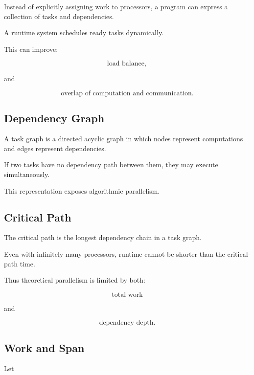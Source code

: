 Instead of explicitly assigning work to processors, a program can express a
collection of tasks and dependencies.

A runtime system schedules ready tasks dynamically.

This can improve:

\[
\boxed{
\text{load balance},
}
\]

and

\[
\boxed{
\text{overlap of computation and communication}.
}
\]

\subsection{Dependency Graph}
\label{subsec:hpmc-dependency-graph}

A task graph is a directed acyclic graph in which nodes represent
computations and edges represent dependencies.

If two tasks have no dependency path between them, they may execute
simultaneously.

This representation exposes algorithmic parallelism.

\subsection{Critical Path}
\label{subsec:hpmc-critical-path}

The critical path is the longest dependency chain in a task graph.

Even with infinitely many processors, runtime cannot be shorter than the
critical-path time.

Thus theoretical parallelism is limited by both:

\[
\boxed{
\text{total work}
}
\]

and

\[
\boxed{
\text{dependency depth}.
}
\]

\subsection{Work and Span}
\label{subsec:work-span}

Let

